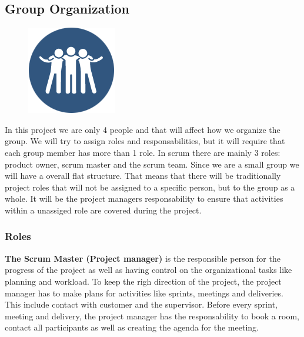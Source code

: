 \clearpage
\subsection{Group Organization}

\begin{figure}
  \begin{center}
  \includegraphics[scale=0.7]{pictures/team.png}
  \end{center}
\end{figure}

In this project we are only 4 people and that will affect how we organize 
the group. We will try to assign roles and responsabilities, but it will
require that each group member has more than 1 role.
In scrum there are mainly 3 roles: product owner, scrum master and the
scrum team. Since we are a small group we will have a overall flat structure. That means that
there will be traditionally project roles that will not be assigned to a specific person, 
but to the group as a whole. It will be the project managers responsability to ensure 
that activities within a unassiged role are covered during the project.

\subsubsection{Roles}

{\bf The Scrum Master (Project manager)} is the responsible person for the progress of the project 
as well as having control on the organizational tasks like planning and workload.
To keep the righ direction of the project, the project manager has to make plans for 
activities like sprints, meetings and deliveries. This include contact with customer and the supervisor.
Before every sprint, meeting and delivery, the project manager has the responsability to book a room, contact all
participants as well as creating the agenda for the meeting. \\


